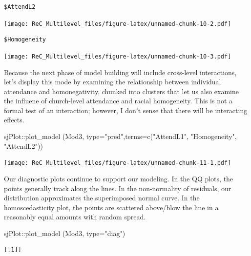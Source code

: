 \documentclass[
  11pt,
]{book}
\newenvironment{Shaded}{\begin{snugshade}}{\end{snugshade}}
\newcommand{\AttributeTok}[1]{\textcolor[rgb]{0.77,0.63,0.00}{#1}}
\newcommand{\FunctionTok}[1]{\textcolor[rgb]{0.00,0.00,0.00}{#1}}
\newcommand{\NormalTok}[1]{#1}
\newcommand{\SpecialCharTok}[1]{\textcolor[rgb]{0.00,0.00,0.00}{#1}}
\newcommand{\StringTok}[1]{\textcolor[rgb]{0.31,0.60,0.02}{#1}}
\begin{document}
\begin{verbatim}
$AttendL2
\end{verbatim}

\texttt{[image: ReC\_Multilevel\_files/figure-latex/unnamed-chunk-10-2.pdf]}

\begin{verbatim}
$Homogeneity
\end{verbatim}

\texttt{[image: ReC\_Multilevel\_files/figure-latex/unnamed-chunk-10-3.pdf]}

Because the next phase of model building will include cross-level interactions, let's display this mode by examining the relationship between individual attendance and homonegativity, chunked into clusters that let us also examine the influene of church-level attendance and racial homogeneity. This is not a formal test of an interaction; however, I don't sense that there will be interacting effects.

\begin{Shaded}
\begin{Highlighting}[]
\NormalTok{sjPlot}\SpecialCharTok{::}\FunctionTok{plot\_model}\NormalTok{ (Mod3, }\AttributeTok{type=}\StringTok{"pred"}\NormalTok{,}\AttributeTok{terms=}\FunctionTok{c}\NormalTok{(}\StringTok{"AttendL1"}\NormalTok{, }\StringTok{"Homogeneity"}\NormalTok{, }\StringTok{"AttendL2"}\NormalTok{))}
\end{Highlighting}
\end{Shaded}

\texttt{[image: ReC\_Multilevel\_files/figure-latex/unnamed-chunk-11-1.pdf]}

Our diagnostic plots continue to support our modeling. In the QQ plots, the points generally track along the lines. In the non-normality of residuals, our distribution approximates the superimposed normal curve. In the homoscedasticity plot, the points are scattered above/blow the line in a reasonably equal amounts with random spread.

\begin{Shaded}
\begin{Highlighting}[]
\NormalTok{sjPlot}\SpecialCharTok{::}\FunctionTok{plot\_model}\NormalTok{ (Mod3, }\AttributeTok{type=}\StringTok{"diag"}\NormalTok{)}
\end{Highlighting}
\end{Shaded}

\begin{verbatim}
[[1]]
\end{verbatim}
\end{document}
